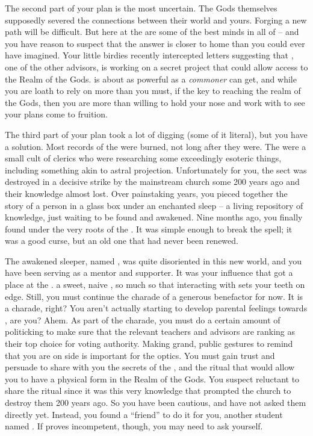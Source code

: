 \documentclass[char]{GL2020}
\begin{document}
The second part of your plan is the most uncertain. The Gods themselves supposedly severed the connections between their world and yours. Forging a new path will be difficult. But here at the \pSc{} are some of the best minds in all of \pEarth{} -- and you have reason to suspect that the answer is closer to home than you could ever have imagined. Your little birdies recently intercepted letters suggesting that \cCurse{\full}, one of the other \pFarm{} advisors, is working on a secret project that could allow access to the Realm of the Gods. \cCurse{} is about as powerful as a \emph{commoner} can get, and while you are loath to rely on \cCurse{\them} more than you must, if \cCurse{\they} \cCurse{\have} the key to reaching the realm of the Gods, then you are more than willing to hold your nose and work with \cCurse{\them} to see your plans come to fruition. 

The third part of your plan took a lot of digging (some of it literal), but you have a solution. Most records of the \cDisneySect{} were burned, not long after they were. The \cDisneySect{} were a small cult of \cFarmGod{} clerics who were researching some exceedingly esoteric things, including something akin to astral projection. Unfortunately for you, the sect was destroyed in a decisive strike by the mainstream church some 200 years ago and their knowledge almost lost. Over painstaking years, you pieced together the story of a person in a glass box under an enchanted sleep – a living repository of knowledge, just waiting to be found and awakened. Nine months ago, you finally found \cDisney{\them} under the very roots of the \pSpine{}. It was simple enough to break the spell; it was a good curse, but an old one that had never been renewed. 

The awakened sleeper, named \cDisney{\full}, was quite disoriented in this new world, and you have been serving as a mentor and supporter. It was your influence that got \cDisney{} a place at the \pSchool{}. \cDisney{\They} \cDisney{\are} a sweet, naive \cDisney{\child}, so much so that interacting with \cDisney{\them} sets your teeth on edge. Still, you must continue the charade of a generous benefactor for now. It is a charade, right? You aren’t actually starting to develop parental feelings towards \cDisney{}, are you? Ahem. As part of the charade, you must do a certain amount of politicking to make sure that the relevant teachers and advisors are ranking \cDisney{} as their top choice for voting authority. Making grand, public gestures to remind \cDisney{} that you are on \cDisney{\their} side is important for the optics. You must gain \cDisney{\their} trust and persuade \cDisney{\them} to share with you the secrets of the \cDisneySect{}, and the ritual that would allow you to have a physical form in the Realm of the Gods. You suspect \cDisney{\theyare} reluctant to share the ritual since it was this very knowledge that prompted the church to destroy them 200 years ago. So you have been cautious, and have not asked them directly yet. Instead, you found \cDisney{\them} a ``friend'' to do it for you, another student named \cPirateChild{\full}. If \cPirateChild{} proves incompetent, though, you may need to ask \cDisney{} yourself.
\end{document}
